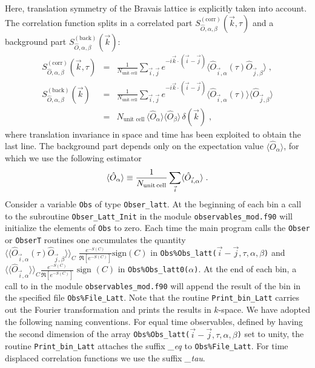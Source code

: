 \documentclass{SciPost}
\begin{document}
Here,  translation symmetry of the Bravais lattice is explicitly taken into account. 
The correlation function splits in a correlated part $S_{\hat{O},\alpha,\beta}^{\mathrm{(corr)}}(\vec{k},\tau)$ and a background part $S_{\hat{O},\alpha,\beta}^{\mathrm{(back)}}(\vec{k})$:
\begin{eqnarray}
  S_{\hat{O},\alpha,\beta}^{\mathrm{(corr)}}(\vec{k},\tau)
  &=&
   \frac{1}{N_{\text{unit cell}}} \sum_{\vec{i},\vec{j}}  e^{- i\vec{k} \cdot \left( \vec{i}-\vec{j}\right) }  \langle \hat{O}_{\vec{i},\alpha} (\tau) \hat{O}_{\vec{j},\beta} \rangle\label{eqn:s_corr}\;,\\
         S_{\hat{O},\alpha,\beta}^{\mathrm{(back)}}(\vec{k})
  &=&
   \frac{1}{N_{\text{unit cell}}} \sum_{\vec{i},\vec{j}}  e^{- i\vec{k} \cdot \left( \vec{i}-\vec{j}\right) }  \langle \hat{O}_{\vec{i},\alpha} (\tau)\rangle \langle \hat{O}_{\vec{j},\beta} \rangle\nonumber\\
  &=& 
  N_{\text{unit cell}}\, \langle \hat{O}_{\alpha} \rangle \langle \hat{O}_{\beta} \rangle \, \delta(\vec{k})\label{eqn:s_back}\;,
\end{eqnarray}
where translation invariance in space and time has been exploited to obtain the last line. 
The background part depends only on the expectation value $\langle \hat{O}_{\alpha} \rangle$, for which we use the following estimator 
\begin{equation}\label{eqn:o}
\langle \hat{O}_{\alpha} \rangle \equiv \frac{1}{N_{\text{unit\,cell}}} \sum\limits_{\vec{i}} \langle \hat{O}_{\vec{i},\alpha} \rangle\;.
\end{equation}
Consider a variable \texttt{Obs} of type  \texttt{Obser\_latt}. At the beginning of each bin a call to the subroutine \texttt{Obser\_Latt\_Init} in the module \texttt{observables\_mod.f90}  will  initialize  the elements of \texttt{Obs} to zero.    Each time the main program calls the   \texttt{Obser} or  \texttt{ObserT} routines one accumulates the quantity $\langle \langle \hat{O}_{\vec{i},\alpha} (\tau) \hat{O}_{\vec{j},\beta} \rangle \rangle_{C} \; \frac{e^{-S(C)}} {\Re \left[e^{-S(C)} \right]}  \text{sign}(C) $    in  \texttt{Obs\%Obs\_latt($\vec{i}-\vec{j},\tau,\alpha,\beta$)} and $ \langle \langle \hat{O}_{\vec{i},\alpha} \rangle \rangle_{C}\frac{e^{-S(C)}} {\Re \left[e^{-S(C)} \right]}  \text{ sign }(C) $  in \texttt{Obs\%Obs\_latt0($\alpha$)}.   At the end of each bin, a call to  in the module  \texttt{observables\_mod.f90}   will append the result of the bin in the specified  file \texttt{Obs\%File\_Latt}.   Note that the routine  \texttt{Print\_bin\_Latt}  carries out the Fourier transformation and prints the results in $k$-space. 
We have adopted the following naming conventions.
For equal time observables,
defined by having the second dimension  of the array  \texttt{Obs\%Obs\_latt($\vec{i}-\vec{j},\tau,\alpha,\beta$)} set to unity, 
the routine \texttt{Print\_bin\_Latt}  attaches the suffix \emph{\_eq} to \texttt{Obs\%File\_Latt}.  For  time displaced correlation functions we use the suffix \emph{\_tau}.
\end{document}
